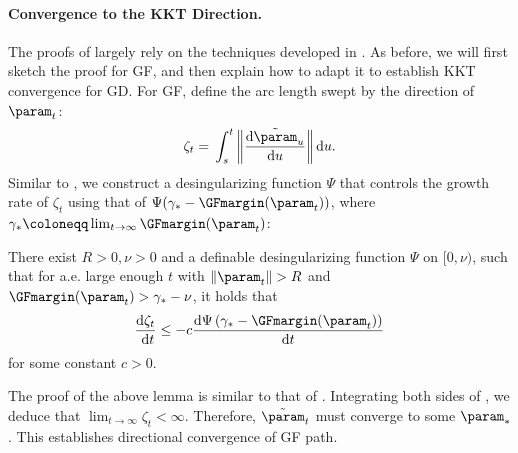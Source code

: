 \paragraph{Convergence to the KKT Direction.}
The proofs of  largely rely on the techniques developed in \citet{ji2020directional}. As before, we will first sketch the proof for GF, and then explain how to adapt it to establish KKT convergence for GD. For GF, define the arc length swept by the direction of $\param_t$:
\begin{equation*}
	\zeta_t = \, \int_{s}^{t} \left\| \frac{\mathrm{d} \tilde{\param}_u}{\mathrm{d} u} \right\| \mathrm{d} u.
\end{equation*}
Similar to \citet{ji2020directional}, we construct a desingularizing function $\Psi$ that controls the growth rate of $\zeta_t$ using that of $\Psi (\gamma_* - \GFmargin (\param_t))$, where $\gamma_* \coloneqq \lim_{t \to \infty} \GFmargin (\param_t)$:
\begin{lemma}
\label{lem: restate of Existence of desingularizing function}
There exist $R>0, \nu>0$ and a definable desingularizing function $\Psi$ on $[0, \nu)$, such that for a.e. large enough $t$ with $\left\|\param_t\right\|>R$ and $\GFmargin(\param_t)>\gamma_*-\nu$, it holds that
\begin{equation}\label{eq:desingularizing_inequality}
	\frac{\mathrm{d} \zeta_t}{\mathrm{~d} t} \leq-c \frac{\mathrm{d} \Psi\left(\gamma_*-\GFmargin(\param_t)\right)}{\mathrm{d} t}
\end{equation}
for some constant $c>0$.
\end{lemma}
The proof of the above lemma is similar to that of \citet[Lemma 3.1]{ji2020directional}. Integrating both sides of , we deduce that $\lim_{t \to \infty} \zeta_t < \infty$. Therefore, $\tilde{\param}_t$ must converge to some $\param_*$. This establishes directional convergence of GF path.

